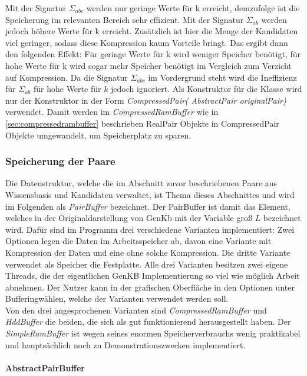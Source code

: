 \documentclass[12pt,a4paper]{article}
\begin{document}
Mit der Signatur $\Sigma_{abc}$ werden nur geringe Werte für k erreicht, demzufolge ist die Speicherung im relevanten Bereich sehr effizient. Mit der Signatur $\Sigma_{ab}$ werden jedoch höhere Werte für k erreicht. Zusätzlich ist hier die Menge der Kandidaten viel geringer, sodass diese Kompression kaum Vorteile bringt. Das ergibt dann den folgenden Effekt: Für geringe Werte für k wird weniger Speicher benötigt, für hohe Werte für k wird sogar mehr Speicher benötigt im Vergleich zum Verzicht auf Kompression. Da die Signatur $\Sigma_{abc}$ im Vordergrund steht wird die Ineffizienz für $\Sigma_{ab}$ für hohe Werte für $k$  jedoch ignoriert. Als Konstruktor für die Klasse wird nur der Konstruktor in der Form \textit{CompressedPair( AbstractPair originalPair)} verwendet. Damit werden im \textit{CompressedRamBuffer} wie in \autoref{sec:compressedrambuffer} beschrieben RealPair Objekte in CompressedPair Objekte umgewandelt, um Speicherplatz zu sparen.


\subsubsection{Speicherung der Paare}



Die Datenstruktur, welche die im Abschnitt zuvor beschriebenen Paare aus Wissensbasis und Kandidaten verwaltet, ist Thema dieses Abschnittes und wird im Folgenden als  \textit{PairBuffer} bezeichnet. Der PairBuffer ist damit das Element, welches in der Originaldarstellung von GenKb mit der Variable groß $L$ bezeichnet wird. Dafür sind im Programm drei verschiedene Varianten implementiert: Zwei Optionen legen die Daten im Arbeitsspeicher ab, davon eine Variante mit Kompression der Daten und eine ohne solche Kompression. Die dritte Variante verwendet als Speicher die Festplatte. Alle drei Varianten besitzen zwei eigene Threads, die der eigentlichen GenKB Implementierung so viel wie möglich Arbeit abnehmen. Der Nutzer kann in der grafischen Oberfläche in den Optionen unter \glqq Buffering\grqq \space wählen, welche der Varianten verwendet werden soll. \\
Von den drei angesprochenen Varianten  sind \textit{CompressedRamBuffer} und \textit{HddBuffer} die beiden, die sich als gut funktionierend herausgestellt haben. Der \textit{SimpleRamBuffer} ist wegen seines enormen Speicherverbrauchs wenig praktikabel und hauptsächlich noch zu Demonstrationszwecken implementiert.

\paragraph{AbstractPairBuffer}\mbox{}
\label{sec:abstractbuffer}
\end{document}
